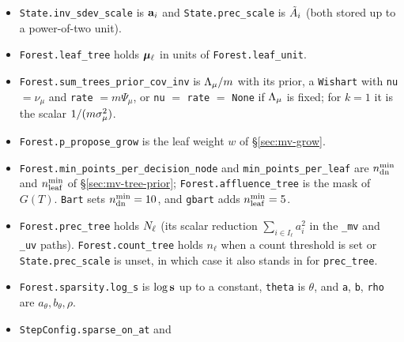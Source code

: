 \begin{description}
\begin{description}
\begin{itemize}
			                  holds the binary rows $z_{i,j}$, $j \in \setB$,
			                  of $\vyt_i$, at the indices
			                  \texttt{State.binary\_indices};
			                  \texttt{State.resid} is $\vyt_i - f(\vx_i)$.
			            \item \texttt{State.inv\_sdev\_scale} is $\mathbf{a}_i$
			                  and \texttt{State.prec\_scale} is
			                  $\tilde{A}_i$ (both stored up to a
			                  power-of-two unit).
			            \item \texttt{Forest.leaf\_tree} holds $\bm{\mu}_\ell$
			                  in units of \texttt{Forest.leaf\_unit}.
			            \item \texttt{Forest.sum\_trees\_prior\_cov\_inv} is
			                  $\Lambda_{\mu} / m$ with its prior, a \texttt{Wishart}
			                  with \texttt{nu} $= \nu_\mu$ and \texttt{rate}
			                  $= m \Psi_\mu$, or \texttt{nu} $=$ \texttt{rate}
			                  $=$ \texttt{None} if $\Lambda_{\mu}$ is fixed; for
			                  $k = 1$ it is the scalar $1/(m \sigma_\mu^{2})$.
			            \item \texttt{Forest.p\_propose\_grow} is the leaf
			                  weight $w$ of \S\ref{sec:mv-grow}.
			            \item \texttt{Forest.min\_points\_per\_decision\_node}
			                  and \texttt{min\_points\_per\_leaf} are
			                  $n^{\min}_{\mathrm{dn}}$ and $n^{\min}_{\mathrm{leaf}}$ of
			                  \S\ref{sec:mv-tree-prior};
			                  \texttt{Forest.affluence\_tree} is the mask of
			                  $G(T)$. \texttt{Bart} sets $n^{\min}_{\mathrm{dn}} = 10$, and
			                  \texttt{gbart} adds $n^{\min}_{\mathrm{leaf}} = 5$.
			            \item \texttt{Forest.prec\_tree} holds $N_\ell$
			                  (its scalar reduction $\sum_{i \in I_\ell}
			                  a_i^2$ in the \texttt{\_mv} and \texttt{\_uv}
			                  paths). \texttt{Forest.count\_tree} holds
			                  $n_\ell$ when a count threshold is set or
			                  \texttt{State.prec\_scale} is unset, in which
			                  case it also stands in for
			                  \texttt{prec\_tree}.
			            \item \texttt{Forest.sparsity.log\_s} is $\log \mathbf{s}$
			                  up to a constant, \texttt{theta} is $\theta$,
			                  and \texttt{a}, \texttt{b}, \texttt{rho} are
			                  $a_\theta, b_\theta, \rho$.
			            \item \texttt{StepConfig.sparse\_on\_at} and

\end{itemize}
\end{description}
\end{description}
